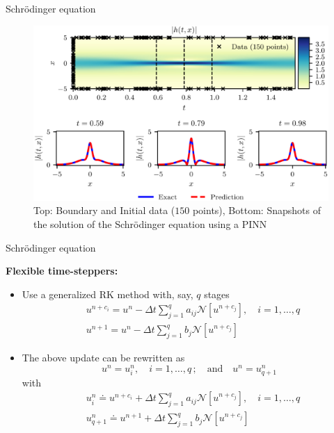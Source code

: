 \documentclass[xcolor=dvipsnames,10pt]{beamer}
\begin{document}
\begin{frame}[t]{Schr\"{o}dinger equation}
  \begin{figure}
    \centering
    \includegraphics[width=0.9\linewidth]{h_tx.eps}
    \caption{
      \centering
      Top: Boundary and Initial data ($150$ points), Bottom: Snapshots of the solution of the Schr\"{o}dinger equation using a PINN
    }
  \end{figure}
\end{frame}
\begin{frame}[t]{Schr\"{o}dinger equation}
  
  {\bf Flexible time-steppers:}
  \begin{itemize}
    \item<2-> Use a generalized RK method with, say, $q$ stages
    $$
      \begin{aligned}
      &u^{n+c_{i}}=u^{n}-\Delta t \sum_{j=1}^{q} a_{i j} \mathcal{N}\left[u^{n+c_{j}}\right], \quad i=1, \ldots, q \\
      &u^{n+1}=u^{n}-\Delta t \sum_{j=1}^{q} b_{j} \mathcal{N}\left[u^{n+c_{j}}\right]
      \end{aligned}
    $$
      \item<3-> The above update can be rewritten as
      $$
        u^{n}=u_{i}^{n}, \quad i=1, \ldots, q\, ;  \quad \text{and}\quad u^{n}=u_{q+1}^{n}
      $$
      with
      $$
        \begin{aligned}
          &u_{i}^{n}\doteq 
          u^{n+c_{i}}+\Delta t \sum_{j=1}^{q} a_{i j} \mathcal{N}\left[u^{n+c_{j}}\right], \quad i=1, \ldots, q \\
          &u_{q+1}^{n}\doteq 
          u^{n+1}+\Delta t \sum_{j=1}^{q} b_{j} \mathcal{N}\left[u^{n+c_{j}}\right]
        \end{aligned}
      $$ 
  \end{itemize}
\end{frame}
\end{document}
